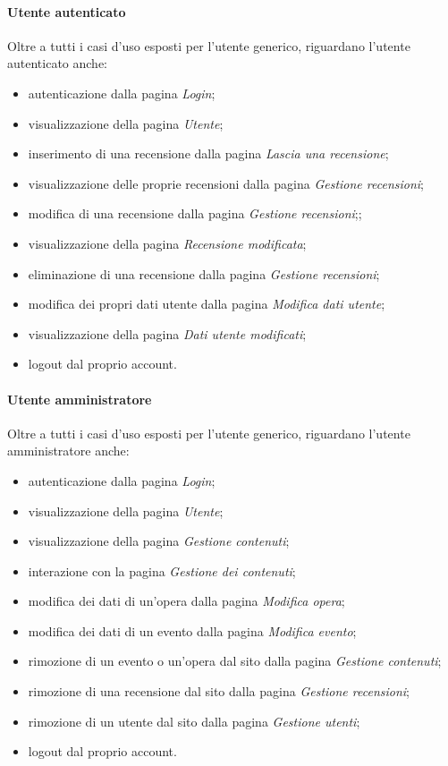 \paragraph{Utente autenticato}
\label{analisi-casi-uso-attori-principali-utente-autenticato}
Oltre a tutti i casi d'uso esposti per l'utente generico, riguardano l'utente autenticato anche:
\begin{itemize}
	\item autenticazione dalla pagina \textit{Login};
	\item visualizzazione della pagina \textit{Utente};
	\item inserimento di una recensione dalla pagina \textit{Lascia una recensione};
	\item visualizzazione delle proprie recensioni dalla pagina \textit{Gestione recensioni};
	\item modifica di una recensione dalla pagina \textit{Gestione recensioni};;
	\item visualizzazione della pagina \textit{Recensione modificata};
	\item eliminazione di una recensione dalla pagina \textit{Gestione recensioni};
	\item modifica dei propri dati utente dalla pagina \textit{Modifica dati utente};
	\item visualizzazione della pagina \textit{Dati utente modificati};
	\item logout dal proprio account.
\end{itemize}

\paragraph{Utente amministratore}
\label{analisi-casi-uso-attori-principali-utente-amministratore}
Oltre a tutti i casi d'uso esposti per l'utente generico, riguardano l'utente amministratore anche:
\begin{itemize}
	\item autenticazione dalla pagina \textit{Login};
	\item visualizzazione della pagina \textit{Utente};
	\item visualizzazione della pagina \textit{Gestione contenuti};
	\item interazione con la pagina \textit{Gestione dei contenuti};
	\item modifica dei dati di un'opera dalla pagina \textit{Modifica opera};
	\item modifica dei dati di un evento dalla pagina \textit{Modifica evento};
	\item rimozione di un evento o un'opera dal sito dalla pagina \textit{Gestione contenuti};
	\item rimozione di una recensione dal sito dalla pagina \textit{Gestione recensioni};
	\item rimozione di un utente dal sito dalla pagina \textit{Gestione utenti};
	\item logout dal proprio account.
\end{itemize}
